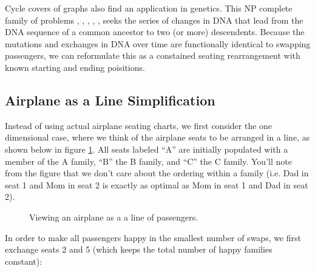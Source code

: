\documentclass[11pt,twocolumn]{article}
\begin{document}
Cycle covers of graphs also find an application in genetics.  This NP complete family of problems \cite{bryant1998complexity}, \cite{durrett2005genomic}, \cite{goldberg2001complexity}, \cite{caprara1999formulations}, \cite{sankoff1997median}, \cite{popov2007multiple} seeks the series of changes in DNA that lead from the DNA sequence of a common ancestor to two (or more) descendents.  Because the mutations and exchanges in DNA over time are functionally identical to swapping passengers, we can reformulate this as a constained seating rearrangement with known starting and ending poisitions.

\subsection{Airplane as a Line Simplification}

Instead of using actual airplane seating charts, we first consider the one dimensional case, where we think of the airplane seats to be arranged in a line, as shown below in figure \ref{fig:lineplane}.  All seats labeled ``A'' are initially populated with a member of the A family, ``B'' the B family, and ``C'' the C family.  You'll note from the figure that we don't care about the ordering within a family (i.e. Dad in seat 1 and Mom in seat 2 is exactly as optimal as Mom in seat 1 and Dad in seat 2). 

\begin{figure}[H]
\label{fig:lineplane}
\centering
{}
\caption{Viewing an airplane as a a line of passengers.}
\end{figure}

In order to make all passengers happy in the smallest number of swaps, we first exchange seats 2 and 5 (which keeps the total number of happy families constant):

\begin{figure}[H]
\centering
{}
\end{figure}
\end{document}
